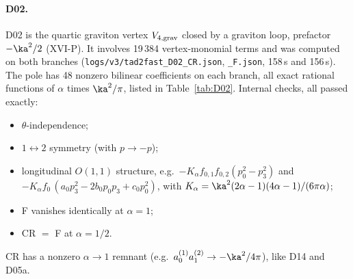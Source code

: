 \paragraph{D02.} D02 is the quartic graviton vertex $V_{4,\rm grav}$ closed by a graviton loop, prefactor $-\ka^2/2$ (XVI-P). It involves 19\,384 vertex-monomial terms and was computed on both branches (\texttt{logs/v3/tad2fast\_D02\_CR.json}, \texttt{\_F.json}, 158\,s and 156\,s). The pole has 48 nonzero bilinear coefficients on each branch, all exact rational functions of $\alpha$ times $\ka^2/\pi$, listed in Table~\ref{tab:D02}. Internal checks, all passed exactly:
\begin{itemize}
\item $\theta$-independence;
\item $1\leftrightarrow2$ symmetry (with $p\to-p$);
\item longitudinal $O(1,1)$ structure, e.g.\ $-K_\alpha f_{0,1}f_{0,2}(p_0^2-p_3^2)$ and $-K_\alpha f_0\,(a_0p_3^2-2b_0p_0p_3+c_0p_0^2)$, with $K_\alpha=\ka^2(2\alpha-1)(4\alpha-1)/(6\pi\alpha)$;
\item F vanishes identically at $\alpha=1$;
\item CR $=$ F at $\alpha=1/2$.
\end{itemize}
CR has a nonzero $\alpha\to1$ remnant (e.g.\ $a_0^{(1)}a_1^{(2)}\to-\ka^2/4\pi$), like D14 and D05a.
